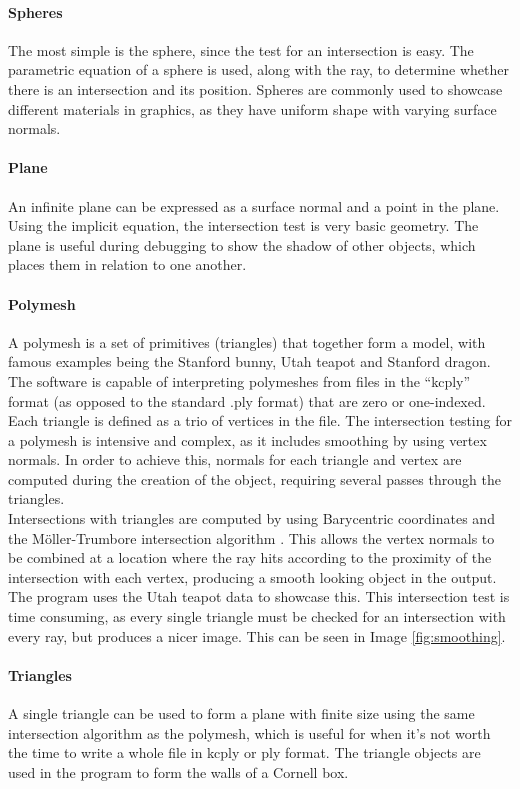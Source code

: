 \documentclass[a4paper]{article}
\begin{document}
\paragraph{Spheres} The most simple is the sphere, since the test for an intersection is easy. The parametric equation of a sphere is used, along with the ray, to determine whether there is an intersection and its position. Spheres are commonly used to showcase different materials in graphics, as they have uniform shape with varying surface normals.

\paragraph{Plane} An infinite plane can be expressed as a surface normal and a point in the plane. Using the implicit equation, the intersection test is very basic geometry. The plane is useful during debugging to show the shadow of other objects, which places them in relation to one another.

\paragraph{Polymesh} A polymesh is a set of primitives (triangles) that together form a model, with famous examples being the Stanford bunny, Utah teapot and Stanford dragon. The software is capable of interpreting polymeshes from files in the ``kcply'' format (as opposed to the standard .ply format) that are zero or one-indexed. Each triangle is defined as a trio of vertices in the file. The intersection testing for a polymesh is intensive and complex, as it includes smoothing by using vertex normals. In order to achieve this, normals for each triangle and vertex are computed during the creation of the object, requiring several passes through the triangles.\\

Intersections with triangles are computed by using Barycentric coordinates and the M{\"o}ller-Trumbore intersection algorithm \cite{Moller1997mtalgo}. This allows the vertex normals to be combined at a location where the ray hits according to the proximity of the intersection with each vertex, producing a smooth looking object in the output. The program uses the Utah teapot data to showcase this. This intersection test is time consuming, as every single triangle must be checked for an intersection with every ray, but produces a nicer image. This can be seen in Image \ref{fig:smoothing}.

\paragraph{Triangles} A single triangle can be used to form a plane with finite size using the same intersection algorithm as the polymesh, which is useful for when it's not worth the time to write a whole file in kcply or ply format. The triangle objects are used in the program to form the walls of a Cornell box.
\end{document}
